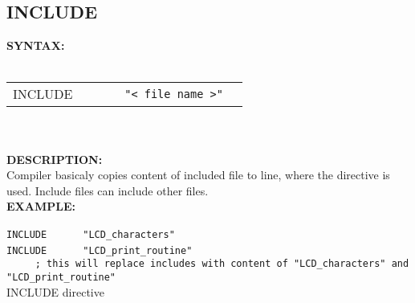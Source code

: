                \subsection{INCLUDE}
                \textbf{SYNTAX:}\\
                \\ {
                    \texttt{}
                    \begin{tabular}[h!]{llll}
                        { \color{highlight_directive} INCLUDE } & \verb`    ` &{ \color{highlight_symbol}\verb`"< file name >"`  }\\
                    \end{tabular}
                    }\\
                    \\
                \textbf{DESCRIPTION:}\\
                Compiler basicaly copies content of included file to line, where the directive is used. Include files can include other files.\\
                \textbf{EXAMPLE:}\\
                    \begin{code}[h!]
                        {\color{highlight_directive}\verb'INCLUDE'} \verb'    ' {\color{highlight_symbol}\verb' "LCD_characters"'}\\
                        {\color{highlight_directive}\verb'INCLUDE'} \verb'    ' {\color{highlight_symbol}\verb' "LCD_print_routine"'}\\
                        \verb'    '{\color{highlight_comment}\verb' ; this will replace includes with content of "LCD_characters" and "LCD_print_routine"'}\\
                        \caption{INCLUDE directive}
                    \end{code}

